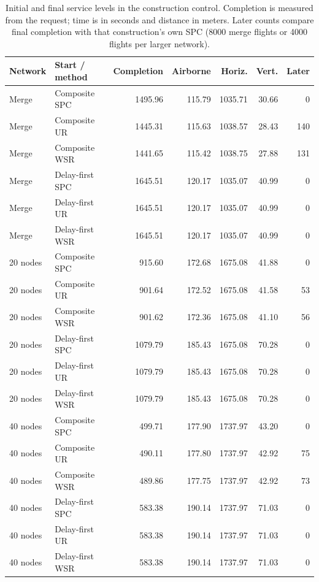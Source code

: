 \begin{table}[!htbp]
\caption{Initial and final service levels in the construction control. Completion is measured from the request; time is in seconds and distance in meters. Later counts compare final completion with that construction's own SPC (8000 merge flights or 4000 flights per larger network).}\label{tab:construction-service}
\centering\small
\begin{tabularx}{\textwidth}{l L r r r r r}
\toprule Network & Start / method & Completion & Airborne & Horiz. & Vert. & Later\\\midrule
Merge & Composite SPC & 1495.96 & 115.79 & 1035.71 & 30.66 & 0\\
Merge & Composite UR & 1445.31 & 115.63 & 1038.57 & 28.43 & 140\\
Merge & Composite WSR & 1441.65 & 115.42 & 1038.75 & 27.88 & 131\\
Merge & Delay-first SPC & 1645.51 & 120.17 & 1035.07 & 40.99 & 0\\
Merge & Delay-first UR & 1645.51 & 120.17 & 1035.07 & 40.99 & 0\\
Merge & Delay-first WSR & 1645.51 & 120.17 & 1035.07 & 40.99 & 0\\
20 nodes & Composite SPC & 915.60 & 172.68 & 1675.08 & 41.88 & 0\\
20 nodes & Composite UR & 901.64 & 172.52 & 1675.08 & 41.58 & 53\\
20 nodes & Composite WSR & 901.62 & 172.36 & 1675.08 & 41.10 & 56\\
20 nodes & Delay-first SPC & 1079.79 & 185.43 & 1675.08 & 70.28 & 0\\
20 nodes & Delay-first UR & 1079.79 & 185.43 & 1675.08 & 70.28 & 0\\
20 nodes & Delay-first WSR & 1079.79 & 185.43 & 1675.08 & 70.28 & 0\\
40 nodes & Composite SPC & 499.71 & 177.90 & 1737.97 & 43.20 & 0\\
40 nodes & Composite UR & 490.11 & 177.80 & 1737.97 & 42.92 & 75\\
40 nodes & Composite WSR & 489.86 & 177.75 & 1737.97 & 42.92 & 73\\
40 nodes & Delay-first SPC & 583.38 & 190.14 & 1737.97 & 71.03 & 0\\
40 nodes & Delay-first UR & 583.38 & 190.14 & 1737.97 & 71.03 & 0\\
40 nodes & Delay-first WSR & 583.38 & 190.14 & 1737.97 & 71.03 & 0\\
\bottomrule
\end{tabularx}
\end{table}
